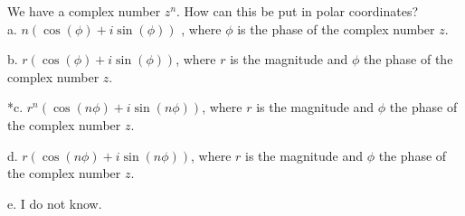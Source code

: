 
We have a complex number \(z^{n}\). How can this be put in polar coordinates?\\

a. \(n(\cos(\phi) + i\sin(\phi))\) , where \(\phi\) is the phase of
the complex number \(z\).

b. \(r(\cos(\phi)+ i\sin(\phi))\), where \(r\) is the magnitude and
\(\phi\) the phase of the complex number \(z\).

*c. \(r^{n}(\cos(n\phi)+i\sin(n\phi))\), where \(r\) is the magnitude
and \(\phi\) the phase of the complex number \(z\).

d. \(r(\cos(n\phi)+i\sin(n\phi))\), where \(r\) is the magnitude and
\(\phi\) the phase of the complex number \(z\).

e. I do not know.\\
